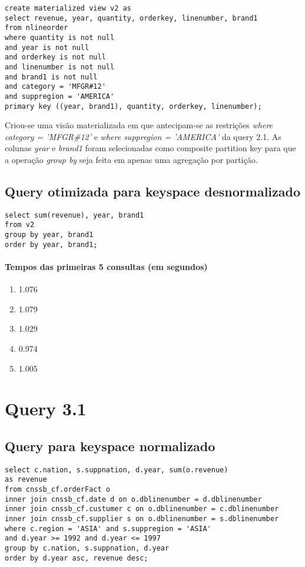 \documentclass[12pt]{article}
\begin{document}
\begin{lstlisting}
create materialized view v2 as 
select revenue, year, quantity, orderkey, linenumber, brand1
from nlineorder
where quantity is not null
and year is not null
and orderkey is not null
and linenumber is not null
and brand1 is not null
and category = 'MFGR#12'
and suppregion = 'AMERICA'
primary key ((year, brand1), quantity, orderkey, linenumber);
\end{lstlisting}

Criou-se uma visão materializada em que antecipam-se as restrições \emph{where category = 'MFGR\#12'} e \emph{where suppregion = 'AMERICA'} da query 2.1. As colunas \emph{year} e \emph{brand1} foram selecionadas como composite partition key para que a operação \emph{group by} seja feita em apenas uma agregação por partição.

\subsection{Query otimizada para keyspace desnormalizado}

\begin{lstlisting}
select sum(revenue), year, brand1
from v2
group by year, brand1
order by year, brand1;
\end{lstlisting}

\paragraph{Tempos das primeiras 5 consultas (em segundos)}
\begin{enumerate}
\item 1.076
\item 1.079
\item 1.029 
\item 0.974
\item 1.005
\end{enumerate}

\section{Query 3.1}

\subsection{Query para keyspace normalizado}

\begin{lstlisting}
select c.nation, s.suppnation, d.year, sum(o.revenue)
as revenue 
from cnssb_cf.orderFact o
inner join cnssb_cf.date d on o.dblinenumber = d.dblinenumber
inner join cnssb_cf.custumer c on o.dblinenumber = c.dblinenumber 
inner join cnssb_cf.supplier s on o.dblinenumber = s.dblinenumber
where c.region = 'ASIA' and s.suppregion = 'ASIA'
and d.year >= 1992 and d.year <= 1997
group by c.nation, s.suppnation, d.year
order by d.year asc, revenue desc; 
\end{lstlisting}
\end{document}
